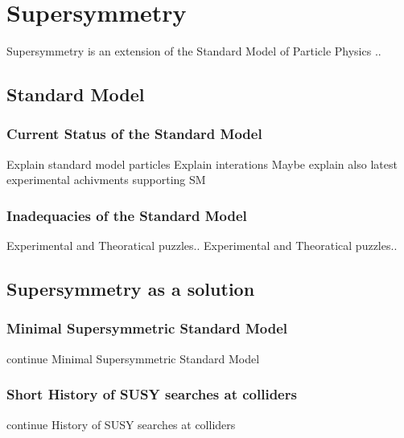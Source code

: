 \chapter{Supersymmetry}
Supersymmetry is an extension of the Standard Model of Particle Physics ..
\section{Standard Model}
\label{sec:StandardModel}
\subsection{Current Status of the Standard Model}
Explain standard model particles
\newpage
Explain interations
\newpage
Maybe explain also latest experimental achivments supporting SM
\subsection{Inadequacies of the Standard Model}
Experimental and Theoratical puzzles..
\newpage
Experimental and Theoratical puzzles..
\newpage
\section{Supersymmetry as a solution}
\newpage
\subsection{Minimal Supersymmetric Standard Model}
\newpage
continue Minimal Supersymmetric Standard Model
\newpage
\subsection{Short History of SUSY searches at colliders}
\newpage
continue History of SUSY searches at colliders
\newpage

